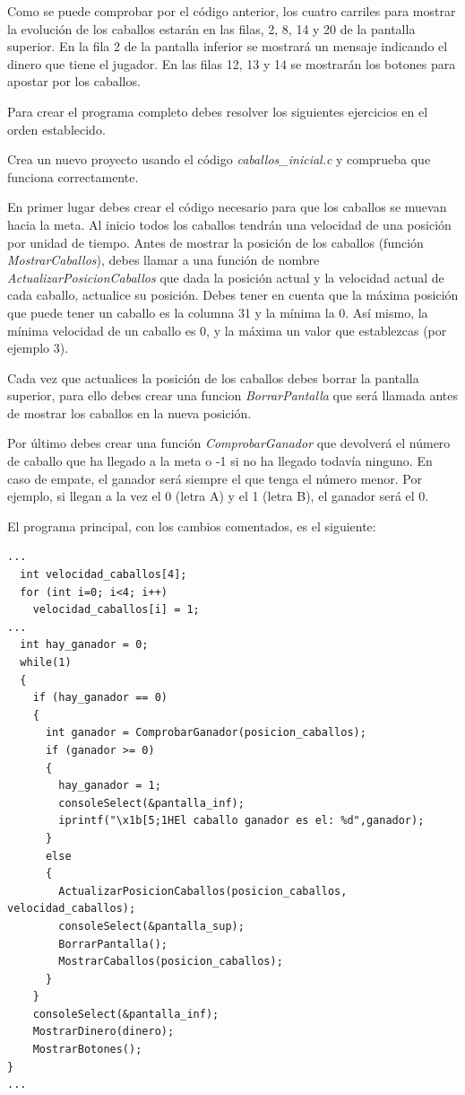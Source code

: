 Como se puede comprobar por el código anterior, los cuatro carriles para mostrar la evolución de los caballos estarán en las filas, 2, 8, 14 y 20 de la pantalla superior. En la fila 2 de la pantalla inferior se mostrará un mensaje indicando el dinero que tiene el jugador. En las filas 12, 13 y 14 se mostrarán los botones para apostar por los caballos.

Para crear el programa completo debes resolver los siguientes ejercicios en el orden establecido.

\begin{exercise}
	Crea un nuevo proyecto usando el código \textit{caballos\_inicial.c} y comprueba que funciona correctamente.
\end{exercise}

En primer lugar debes crear el código necesario para que los caballos se muevan hacia la meta. Al inicio todos los caballos tendrán una velocidad de una posición por unidad de tiempo. Antes de mostrar la posición de los caballos (función \textit{MostrarCaballos}), debes llamar a una función de nombre \textit{ActualizarPosicionCaballos} que dada la posición actual y la velocidad actual de cada caballo, actualice su posición. Debes tener en cuenta que la máxima posición que puede tener un caballo es la columna 31 y la mínima la 0. Así mismo, la mínima velocidad de un caballo es 0, y la máxima un valor que establezcas (por ejemplo 3).

Cada vez que actualices la posición de los caballos debes borrar la pantalla superior, para ello debes crear una funcion \textit{BorrarPantalla} que será llamada antes de mostrar los caballos en la nueva posición.

Por último debes crear una función \textit{ComprobarGanador} que devolverá el número de caballo que ha llegado a la meta o -1 si no ha llegado todavía ninguno. En caso de empate, el ganador será siempre el que tenga el número menor. Por ejemplo, si llegan a la vez el 0 (letra A) y el 1 (letra B), el ganador será el 0.

El programa principal, con los cambios comentados, es el siguiente:

\begin{lstlisting}
...
  int velocidad_caballos[4];
  for (int i=0; i<4; i++)
    velocidad_caballos[i] = 1;
...
  int hay_ganador = 0;
  while(1)
  {
 	if (hay_ganador == 0)
    {
      int ganador = ComprobarGanador(posicion_caballos);
      if (ganador >= 0)
      {
        hay_ganador = 1;
        consoleSelect(&pantalla_inf);
        iprintf("\x1b[5;1HEl caballo ganador es el: %d",ganador);
      }
      else
      {
        ActualizarPosicionCaballos(posicion_caballos, velocidad_caballos);      
        consoleSelect(&pantalla_sup);
        BorrarPantalla();
        MostrarCaballos(posicion_caballos);
      }
    }
    consoleSelect(&pantalla_inf);
    MostrarDinero(dinero);
    MostrarBotones();
}
...
\end{lstlisting}


